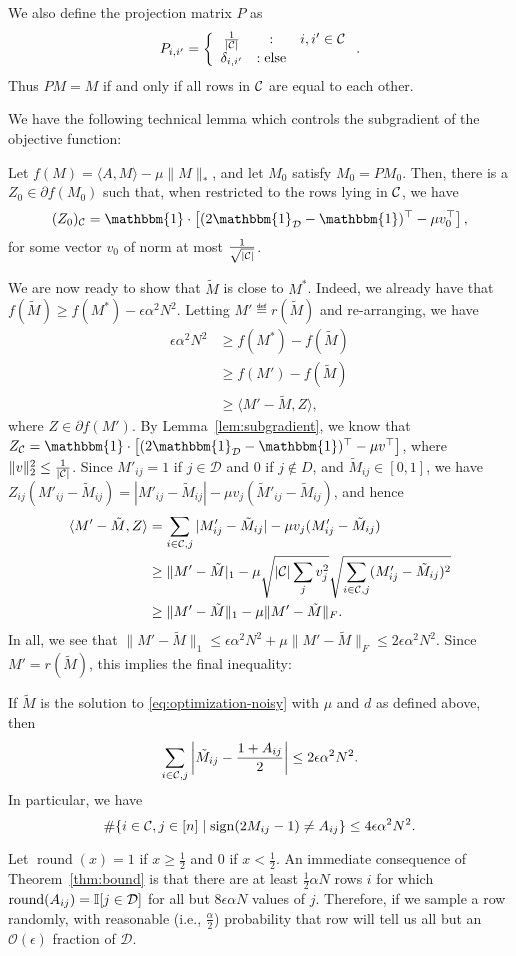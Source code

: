 \documentclass[11pt]{article}
\newcommand{\M}{\tilde{M}}
\newcommand{\sD}{\mathcal{D}}
\newcommand{\oo}{\mathcal{O}}
\newcommand{\bi}{\mathbbm{1}}
\DeclareMathOperator{\round}{round}
\begin{document}
We also define the projection matrix $P$ as
\[ P_{i,i'} = \left\{ \begin{array}{ccl} \frac{1}{|\mathcal{C}|} & : & i, i' \in \mathcal{C} \\ \delta_{i,i'} & : \text{else} \end{array} \right.. \]
Thus $PM = M$ if and only if all rows in $\mathcal{C}$ are equal to each other.

We have the following technical lemma which controls 
the subgradient of the objective function:
\begin{lemma}
\label{lem:subgradient}
Let $f(M) = \langle A, M \rangle - \mu \|M\|_*$, and let 
$M_0$ satisfy $M_0 = PM_0$. Then,
there is a $Z_0 \in \partial f(M_0)$ such that, when restricted 
to the rows lying in $\mathcal{C}$, we have
\[ (Z_0)_{\sC} = \bi \cdot \left[(2\bi_{\sD}-\bi)^{\top} - \mu v_0^{\top}\right], \]
for some vector $v_0$ of norm at most $\frac{1}{\sqrt{|\mathcal{C}|}}$.
\end{lemma}

We are now ready to show that $\M$ is close to $M^*$. Indeed, we already 
have that $f(\M) \geq f(M^*) - \epsilon \alpha^2 N^2$. Letting $M' \eqdef r(\M)$ 
and re-arranging, we have
\begin{align}
\epsilon \alpha^2 N^2 &\geq f(M^*) - f(\M) \\
 &\geq f(M') - f(\M) \\
 &\geq \langle M' - \M, Z \rangle,
\end{align}
where $Z \in \partial f(M')$.
By Lemma~\ref{lem:subgradient}, we know that $Z_{\sC} = \bi \cdot \left[(2\bi_{\sD}-\bi)^{\top} - \mu v^{\top}\right]$, 
where $\|v\|_2^2 \leq \frac{1}{|\mathcal{C}|}$. Since $M'_{ij} = 1$ if $j \in \sD$ and $0$ if $j \not\in D$, and 
$\M_{ij} \in [0,1]$, we have $Z_{ij}(M'_{ij}-\M_{ij}) = |M'_{ij} - \M_{ij}| - \mu v_j(\M'_{ij}-\M_{ij})$, and hence
\begin{align}
\langle M' - \M, Z \rangle &= \sum_{i \in \sC, j} |M'_{ij} - \M_{ij}| - \mu v_j (M'_{ij} - \M_{ij}) \\
 &\geq \|M'-\M|_1 - \mu \sqrt{|\sC|\sum_j v_j^2}\sqrt{\sum_{i \in \sC, j} (M_{ij}'-\M_{ij})^2} \\
 &\geq \|M'-\M\|_1 - \mu \|M' - \M\|_F.
\end{align}
In all, we see that $\|M'-\M\|_1 \leq \epsilon \alpha^2 N^2 + \mu \|M' - \M\|_F \leq 2\epsilon \alpha^2 N^2$.
Since $M' = r(\M)$, this implies the final inequality:
\begin{theorem}
\label{thm:bound}
If $\M$ is the solution to \eqref{eq:optimization-noisy} with $\mu$ and $d$ as defined 
above, then
\[ \sum_{i \in \sC, j} \left|\M_{ij} - \frac{1+A_{ij}}{2}\right| \leq 2\epsilon\alpha^2N^2. \]
In particular, we have
\[ \#\{i \in \mathcal{C}, j \in [n] \mid \operatorname{sign}(2M_{ij}-1) \neq A_{ij}\} \leq 4\epsilon\alpha^2N^2. \]
\end{theorem}
Let $\round(x) = 1$ if $x \geq \frac{1}{2}$ and $0$ if $x < \frac{1}{2}$. An immediate consequence 
of Theorem~\ref{thm:bound} is that 
there are at least $\frac{1}{2}\alpha N$ rows $i$ for which $\round(A_{ij}) = \bI[j \in \sD]$ 
for all but $8\epsilon \alpha N$ values of $j$. Therefore, if we sample a row randomly, with 
reasonable (i.e., $\frac{\alpha}{2}$) probability that row will tell us all but an $\oo(\epsilon)$ fraction of $\sD$.
\end{document}
